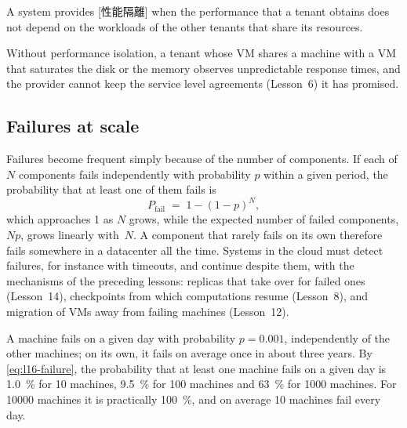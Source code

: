 \documentclass[../main.tex]{subfiles}
\begin{document}
\begin{definition}
  A system provides [性能隔離] when the
  performance that a tenant obtains does not depend on the workloads of the
  other tenants that share its resources.
\end{definition}

Without performance isolation, a tenant whose VM shares a machine with a VM
that saturates the disk or the memory observes unpredictable response times,
and the provider cannot keep the service level
agreements (Lesson~6) it has
promised.

\subsection{Failures at scale}

Failures become frequent simply because of the number of
components.  If
each of $N$ components fails independently with probability $p$ within a
given period, the probability that at least one of them fails is
\begin{equation}
  P_{\mathrm{fail}} \;=\; 1 - (1-p)^{N} ,
  \label{eq:l16-failure}
\end{equation}
which approaches 1 as $N$ grows, while the expected number of failed
components, $Np$, grows linearly with~$N$.  A component that
rarely fails on its own therefore fails somewhere in a datacenter all the
time.  Systems
in the cloud must detect failures, for instance with timeouts, and continue
despite them, with the mechanisms of the preceding lessons: replicas that
take over for failed ones (Lesson~14), checkpoints from which computations
resume (Lesson~8), and migration of VMs away from
failing machines (Lesson~12).

\begin{example}
  A machine fails on a given day with probability $p = 0.001$, independently
  of the other machines; on its own, it fails on average once in about three
  years.  By \cref{eq:l16-failure}, the probability that at least one
  machine fails on a given day is \SI{1.0}{\percent} for 10 machines,
  \SI{9.5}{\percent} for 100 machines and \SI{63}{\percent} for \num{1000}
  machines.  For \num{10000} machines it is practically \SI{100}{\percent},
  and on average 10 machines fail every day.
\end{example}
\end{document}
